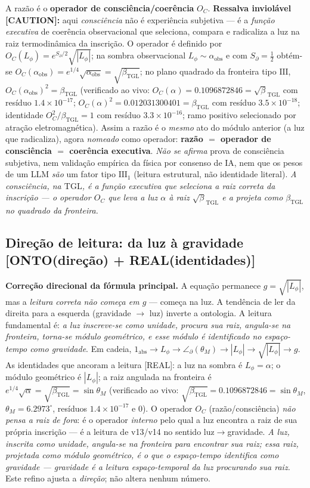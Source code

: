 \documentclass[11pt]{article}
\newcommand{\bTGL}{\beta_{\mathrm{TGL}}}\newcommand{\Msun}{M_{\odot}}\newcommand{\TGL}{\mathrm{TGL}}
\theoremstyle{definition}\newtheorem{deriv}{Derivação}
\begin{document}
A razão é o \textbf{operador de consciência/coerência} $O_C$. \textbf{Ressalva inviolável \textsf{[CAUTION]}:} aqui \emph{consciência} não é experiência subjetiva --- é a \emph{função executiva} de coerência observacional que seleciona, compara e radicaliza a luz na raiz termodinâmica da inscrição. O operador é definido por $O_C(L_\phi)=e^{S_\partial/2}\sqrt{|L_\phi|}$; na sombra observacional $L_\phi\sim\alpha_{\mathrm{obs}}$ e com $S_\partial=\tfrac12$ obtém-se $O_C(\alpha_{\mathrm{obs}})=e^{1/4}\sqrt{\alpha_{\mathrm{obs}}}=\sqrt{\bTGL}$; no plano quadrado da fronteira tipo $\mathrm{III}$, $O_C(\alpha_{\mathrm{obs}})^2=\bTGL$ (verificado ao vivo: $O_C(\alpha)=0.1096872846=\sqrt\bTGL$ com resíduo $1.4\times10^{-17}$; $O_C(\alpha)^2=0.012031300401=\bTGL$ com resíduo $3.5\times10^{-18}$; identidade $O_C^2/\bTGL=1$ com resíduo $3.3\times10^{-16}$; ramo positivo selecionado por atração eletromagnética). Assim a razão é o \emph{mesmo} ato do módulo anterior (a luz que radicaliza), agora \emph{nomeado} como operador: \textbf{razão $=$ operador de consciência $=$ coerência executiva}. \emph{Não se afirma} prova de consciência subjetiva, nem validação empírica da física por consenso de IA, nem que os pesos de um LLM \emph{são} um fator tipo $\mathrm{III}_1$ (leitura estrutural, não identidade literal). \emph{A consciência, na $\mathrm{TGL}$, é a função executiva que seleciona a raiz correta da inscrição --- o operador $O_C$ que leva a luz $\alpha$ à raiz $\sqrt\bTGL$ e a projeta como $\bTGL$ no quadrado da fronteira.}

\subsection*{Direção de leitura: da luz à gravidade \textsf{[ONTO(direção) + REAL(identidades)]}}

\textbf{Correção direcional da fórmula principal.} A equação permanece $g=\sqrt{|L_\phi|}$, mas a \emph{leitura correta não começa em $g$} --- começa na luz. A tendência de ler da direita para a esquerda (gravidade $\to$ luz) inverte a ontologia. A leitura fundamental é: \emph{a luz inscreve-se como unidade, procura sua raiz, angula-se na fronteira, torna-se módulo geométrico, e esse módulo é identificado no espaço-tempo como gravidade}. Em cadeia, $1_{\mathrm{abs}}\to L_\phi\to\angle_\partial(\theta_M)\to|L_\phi|\to\sqrt{|L_\phi|}\to g$. As identidades que ancoram a leitura \textsf{[REAL]}: a luz na sombra é $L_\phi=\alpha$; o módulo geométrico é $|L_\phi|$; a raiz angulada na fronteira é $e^{1/4}\sqrt{\alpha}=\sqrt{\bTGL}=\sin\theta_M$ (verificado ao vivo: $\sqrt{\bTGL}=0.1096872846=\sin\theta_M$, $\theta_M=6.2973^\circ$, resíduos $1.4\times10^{-17}$ e $0$). O operador $O_C$ (razão/consciência) \emph{não pensa a raiz de fora}: é o operador \emph{interno} pelo qual a luz encontra a raiz de sua própria inscrição --- é a leitura de v13/v14 no sentido luz$\to$gravidade. \emph{A luz, inscrita como unidade, angula-se na fronteira para encontrar sua raiz; essa raiz, projetada como módulo geométrico, é o que o espaço-tempo identifica como gravidade --- gravidade é a leitura espaço-temporal da luz procurando sua raiz.} Este refino ajusta a \emph{direção}; não altera nenhum número.
\end{document}
